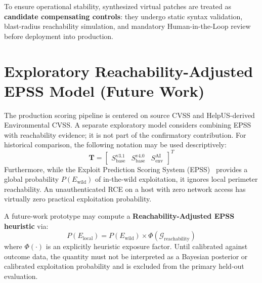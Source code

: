 To ensure operational stability, synthesized virtual patches are treated as \textbf{candidate compensating controls}: they undergo static syntax validation, blast-radius reachability simulation, and mandatory Human-in-the-Loop review before deployment into production.

\section{Exploratory Reachability-Adjusted EPSS Model (Future Work)}
\label{sec:contextual_epss}
The production scoring pipeline is centered on source CVSS and HelpUS-derived Environmental CVSS. A separate exploratory model considers combining EPSS with reachability evidence; it is not part of the confirmatory contribution. For historical comparison, the following notation may be used descriptively:
\begin{equation}
    \mathbf{T} = \begin{bmatrix} S_{\text{base}}^{\text{v3.1}} & S_{\text{base}}^{\text{v4.0}} & S_{\text{env}}^{\text{AI}} \end{bmatrix}^T
\end{equation}
Furthermore, while the Exploit Prediction Scoring System (EPSS)~\cite{jacobs2021exploit} provides a global probability $P(E_{\text{wild}})$ of in-the-wild exploitation, it ignores local perimeter reachability. An unauthenticated RCE on a host with zero network access has virtually zero practical exploitation probability.

A future-work prototype may compute a \textbf{Reachability-Adjusted EPSS heuristic} via:
\begin{equation}
    P(E_{\text{local}}) = P(E_{\text{wild}}) \times \Phi(\mathcal{G}_{\text{reachability}})
\end{equation}
where $\Phi(\cdot)$ is an explicitly heuristic exposure factor. Until calibrated against outcome data, the quantity must not be interpreted as a Bayesian posterior or calibrated exploitation probability and is excluded from the primary held-out evaluation.

